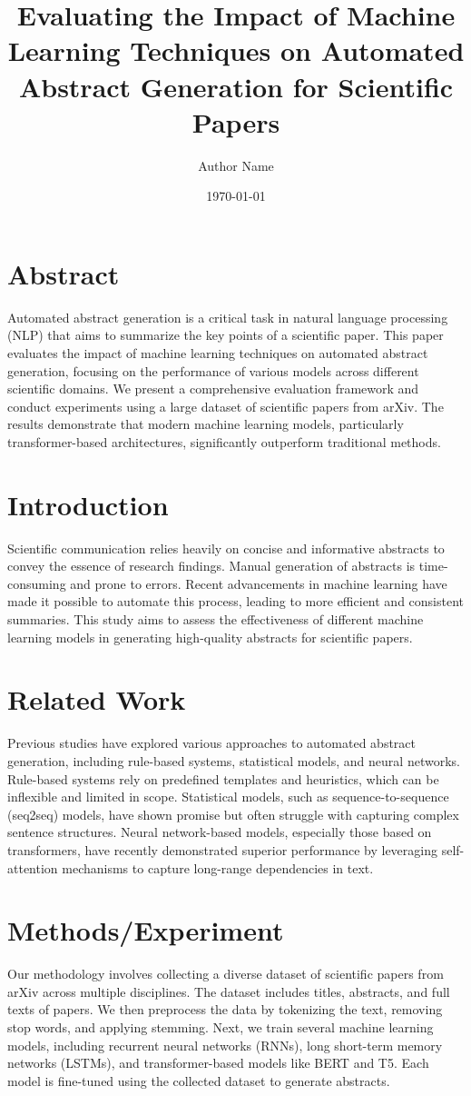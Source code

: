 \documentclass{article}
\title{Evaluating the Impact of Machine Learning Techniques on Automated Abstract Generation for Scientific Papers}
\author{Author Name}
\date{\today}
\begin{document}
\maketitle

\section{Abstract}
Automated abstract generation is a critical task in natural language processing (NLP) that aims to summarize the key points of a scientific paper. This paper evaluates the impact of machine learning techniques on automated abstract generation, focusing on the performance of various models across different scientific domains. We present a comprehensive evaluation framework and conduct experiments using a large dataset of scientific papers from arXiv. The results demonstrate that modern machine learning models, particularly transformer-based architectures, significantly outperform traditional methods.

\section{Introduction}
Scientific communication relies heavily on concise and informative abstracts to convey the essence of research findings. Manual generation of abstracts is time-consuming and prone to errors. Recent advancements in machine learning have made it possible to automate this process, leading to more efficient and consistent summaries. This study aims to assess the effectiveness of different machine learning models in generating high-quality abstracts for scientific papers.

\section{Related Work}
Previous studies have explored various approaches to automated abstract generation, including rule-based systems, statistical models, and neural networks. Rule-based systems rely on predefined templates and heuristics, which can be inflexible and limited in scope. Statistical models, such as sequence-to-sequence (seq2seq) models, have shown promise but often struggle with capturing complex sentence structures. Neural network-based models, especially those based on transformers, have recently demonstrated superior performance by leveraging self-attention mechanisms to capture long-range dependencies in text.

\section{Methods/Experiment}
Our methodology involves collecting a diverse dataset of scientific papers from arXiv across multiple disciplines. The dataset includes titles, abstracts, and full texts of papers. We then preprocess the data by tokenizing the text, removing stop words, and applying stemming. Next, we train several machine learning models, including recurrent neural networks (RNNs), long short-term memory networks (LSTMs), and transformer-based models like BERT and T5. Each model is fine-tuned using the collected dataset to generate abstracts.
\end{document}
